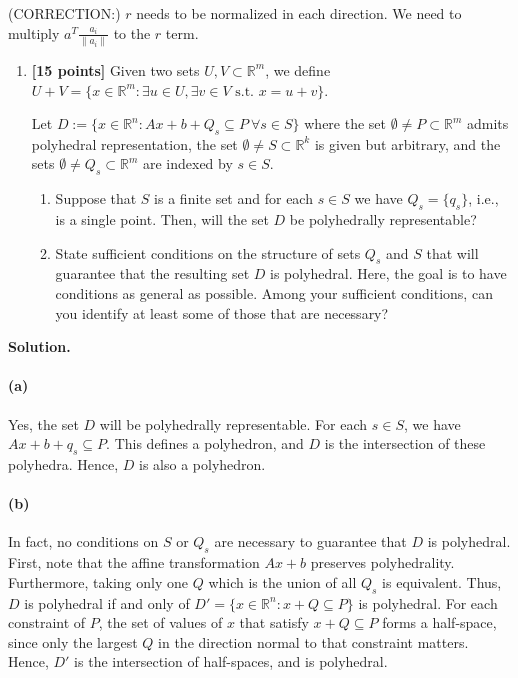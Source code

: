 \documentclass[11pt,letterpaper]{article}
\theoremstyle{definition}
\newcommand{\reals}{\mathbb{R}}
\newcommand{\solution}{\medskip\noindent\textbf{Solution.}\par\medskip}
\begin{document}
(CORRECTION:)
$r$ needs to be normalized in each direction. 
We need to multiply $a^T\frac{a_i}{\lVert a_i\rVert}$ to the $r$ term.

\begin{enumerate}[resume]
\item \textbf{[15 points]} Given two sets $U, V\subset\reals^m$, we define $U + V = \{x\in\reals^m : \exists u\in U, \exists v\in V \text{ s.t. } x = u+v\}$.

Let $D := \{x\in\reals^n : Ax + b + Q_s \subseteq P \ \forall s\in S\}$ where the set $\emptyset \neq P \subset \reals^m$ admits polyhedral representation, the set $\emptyset\neq S\subset\reals^k$ is given but arbitrary, and the sets $\emptyset \neq Q_s \subset \reals^m$ are indexed by $s\in S$.
\begin{enumerate}
\item Suppose that $S$ is a finite set and for each $s\in S$ we have $Q_s = \{q_s\}$, i.e., is a single point. Then, will the set $D$ be polyhedrally representable?
\item State sufficient conditions on the structure of sets $Q_s$ and $S$ that will guarantee that the resulting set $D$ is polyhedral. Here, the goal is to have conditions as general as possible. Among your sufficient conditions, can you identify at least some of those that are necessary?
\end{enumerate}
\end{enumerate}

\solution

\paragraph{(a)} Yes, the set $D$ will be polyhedrally representable.
For each $s\in S$, we have $Ax + b + q_s \subseteq P$. 
This defines a polyhedron, and $D$ is the intersection of these polyhedra.
Hence, $D$ is also a polyhedron.

\paragraph{(b)} In fact, no conditions on $S$ or $Q_s$ are necessary to guarantee that $D$ is polyhedral.
First, note that the affine transformation $Ax + b$ preserves polyhedrality.
Furthermore, taking only one $Q$ which is the union of all $Q_s$ is equivalent.
Thus, $D$ is polyhedral if and only of $D' = \{x\in\reals^n : x + Q \subseteq P\}$ is polyhedral.
For each constraint of $P$, the set of values of $x$ that satisfy $x + Q \subseteq P$ forms a half-space, since only the largest $Q$ in the direction normal to that constraint matters.
Hence, $D'$ is the intersection of half-spaces, and is polyhedral.
\end{document}
